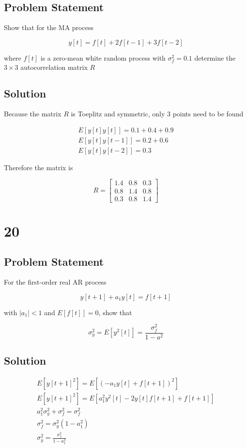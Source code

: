 \documentclass[11pt,a4paper,final]{article}
\begin{document}
\subsection{Problem Statement}
\label{sec:orga3e14cc}
Show that for the MA process

$$
y[t] = f[t] + 2f[t-1] + 3f[t-2]
$$

where \(f[t]\) is a zero-mean white random process with \(\sigma^2_f = 0.1\) determine the \(3 \times 3\) autocorrelation matrix \(R\)

\subsection{Solution}
\label{sec:orgd9ebd02}

Because the matrix \(R\) is Toeplitz and symmetric, only 3 points need to be found

\begin{equation*}
\begin{array}{l}
E[y[t]y[t]] = 0.1 + 0.4 + 0.9 \\
E[y[t]y[t-1]] = 0.2 + 0.6 \\
E[y[t]y[t-2]] = 0.3
\end{array}
\end{equation*}

Therefore the matrix is

\begin{equation*}
R =
\begin{bmatrix}
1.4 & 0.8 & 0.3 \\
0.8 & 1.4 & 0.8 \\
0.3 & 0.8 & 1.4
\end{bmatrix}
\end{equation*}

\section{20}
\label{sec:orgb7511ae}
\subsection{Problem Statement}
\label{sec:org0abe840}
For the first-order real AR process

$$
y[t+1] + a_1 y[t] = f[t+1]
$$

with \(|a_1| < 1\) and \(E[f[t]]=0\), show that

$$
\sigma^2_y = E[y^2[t]] = \frac{\sigma^2_f}{1-a^2}
$$

\subsection{Solution}
\label{sec:orge213734}
\begin{equation*}
\begin{array}{l}
E[y[t+1]^2] = E[(-a_1 y[t] + f[t+1])^2] \\
E[y[t+1]^2] = E[a_1^2 y^2[t] - 2y[t]f[t+1] + f[t+1]] \\
a_1^2 \sigma_y^2 + \sigma_f^2 = \sigma_f^2 \\
\sigma_f^2 = \sigma_y^2(1-a_1^2) \\
\sigma_y^2 = \frac{\sigma_f^2}{1-a_1^2}
\end{array}
\end{equation*}
\end{document}
